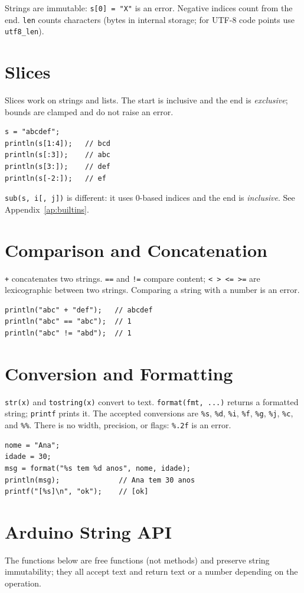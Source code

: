 \documentclass[11pt,a4paper,oneside]{report}
\newcommand{\code}[1]{\texttt{#1}}
\begin{document}
Strings are immutable: \code{s[0] = "X"} is an error. Negative indices
count from the end. \code{len} counts characters (bytes in internal
storage; for UTF-8 code points use \code{utf8\_len}).

\section{Slices}
Slices work on strings and lists. The start is inclusive and the end is
\emph{exclusive}; bounds are clamped and do not raise an error.

\begin{lstlisting}
s = "abcdef";
println(s[1:4]);   // bcd
println(s[:3]);    // abc
println(s[3:]);    // def
println(s[-2:]);   // ef
\end{lstlisting}

\code{sub(s, i[, j])} is different: it uses 0-based indices and the end
is \emph{inclusive}. See Appendix~\ref{ap:builtins}.

\section{Comparison and Concatenation}
\code{+} concatenates two strings. \code{==} and \code{!=} compare
content; \code{< > <= >=} are lexicographic between two strings.
Comparing a string with a number is an error.

\begin{lstlisting}
println("abc" + "def");   // abcdef
println("abc" == "abc");  // 1
println("abc" != "abd");  // 1
\end{lstlisting}

\section{Conversion and Formatting}
\code{str(x)} and \code{tostring(x)} convert to text.
\code{format(fmt, ...)} returns a formatted string; \code{printf} prints
it. The accepted conversions are \code{\%s}, \code{\%d}, \code{\%i},
\code{\%f}, \code{\%g}, \code{\%j}, \code{\%c}, and \code{\%\%}.
There is no width, precision, or flags: \code{\%.2f} is an error.

\begin{lstlisting}
nome = "Ana";
idade = 30;
msg = format("%s tem %d anos", nome, idade);
println(msg);              // Ana tem 30 anos
printf("[%s]\n", "ok");    // [ok]
\end{lstlisting}

\section{Arduino String API}
The functions below are free functions (not methods) and preserve string
immutability; they all accept text and return text or a number depending
on the operation.
\end{document}
